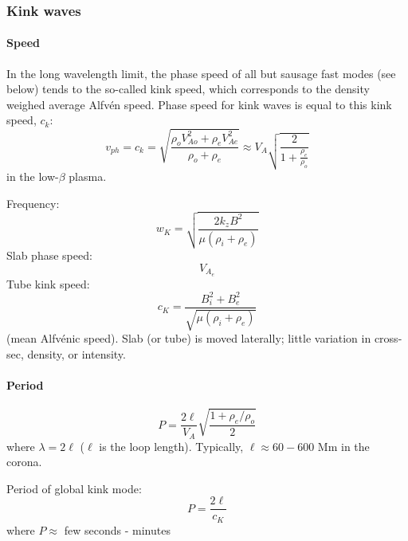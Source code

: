 
\subsubsection{Kink waves}

\paragraph{Speed}
In the long wavelength limit, the phase speed of all but sausage fast modes
(see below) tends to the so-called kink speed, which corresponds to the density
weighed average Alfv\'en speed.
Phase speed for kink waves is equal to this kink speed, $c_{k}$:
\[
    v_{ph}
    = c_{k}
    = \sqrt{\frac{\rho_{o}V^{2}_{Ao}+\rho_{e}V^{2}_{Ae}} {\rho_o+\rho_e}}
    \approx V_{A}\sqrt{\frac{2}{1 + \frac{\rho_{e}}{\rho_{o}}}}
    \]
in the low-$\beta$ plasma.

Frequency:
\[
    w_{K} = \sqrt{ \frac{2k_{z}B^{2}}{\mu(\rho_{i}+\rho_{e})}  }
    \]
Slab phase speed:
\[
    V_{A_{e}}
    \]
Tube kink speed:
\[
    c_{K} = \frac{B_{i}^{2} + B_{e}^{2}}{\sqrt{\mu(\rho_{i}+\rho_{e})}}
    \]
(mean Alfv\'enic speed). Slab (or tube) is moved laterally; little variation in
cross-sec, density, or intensity.

\paragraph{Period}
\[
    P = \frac{2\ell}{V_A}\sqrt{\frac{1+\rho_e/\rho_o}{2}}
    \]
where $\lambda=2\ell$ ($\ell$ is the loop length).
Typically, $\ell \approx 60-600$ Mm in the corona.

Period of global kink mode:
\[
    P = \frac{2\ell}{c_{K}}
    \]
where $P \approx $ few seconds - minutes

\newpage
